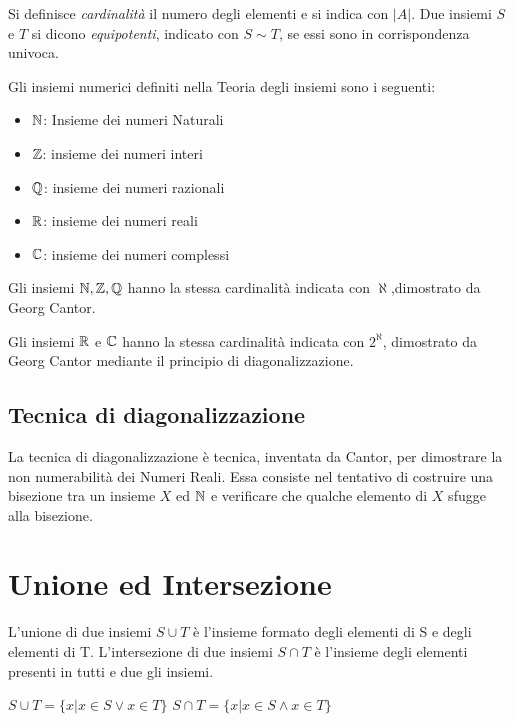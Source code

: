 Si definisce \textit{cardinalità} il numero degli elementi e si indica con $|A|$.\newline
Due insiemi $S$ e $T$ si dicono \textit{equipotenti}, indicato con $S \sim T$, se
essi sono in corrispondenza univoca.

Gli insiemi numerici definiti nella Teoria degli insiemi sono i seguenti: \newline
\begin{itemize}
  \item $\mathbb{N}$: Insieme dei numeri Naturali
  \item $\mathbb{Z}$: insieme dei numeri interi
  \item $\mathbb{Q}$: insieme dei numeri razionali
  \item $\mathbb{R}$: insieme dei numeri reali
  \item $\mathbb{C}$: insieme dei numeri complessi
\end{itemize}

Gli insiemi $\mathbb{N}, \mathbb{Z}, \mathbb{Q}$ hanno la stessa cardinalità indicata con $\aleph$,dimostrato da Georg Cantor.

Gli insiemi $\mathbb{R}$ e $\mathbb{C}$ hanno la stessa cardinalità indicata con $ 2 ^ \aleph$,
dimostrato da Georg Cantor mediante il principio di diagonalizzazione.

\subsection{Tecnica di diagonalizzazione}
La tecnica di diagonalizzazione è tecnica, inventata da Cantor, per dimostrare la
non numerabilità dei Numeri Reali.\newline
Essa consiste nel tentativo di costruire una bisezione tra un insieme $X$ ed $\mathbb{N}$
e verificare che qualche elemento di $X$ sfugge alla bisezione.


\section{Unione ed Intersezione}
L'unione di due insiemi $S \cup T$ è l'insieme formato degli elementi di S e degli
elementi di T.\newline
L'intersezione di due insiemi $S \cap T$ è l'insieme degli elementi presenti in
tutti e due gli insiemi.

$S \cup T = \{x | x \in S \lor x \in T \} $ \newline
$S \cap T = \{x | x \in S \land x \in T \} $

